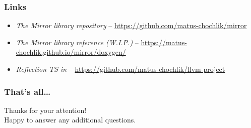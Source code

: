 \documentclass[compress,table,xcolor=table]{beamer}
\begin{document}
\begin{frame}
  \frametitle{Links}
  \smaller
  \begin{itemize}
    \item {\em The Mirror library repository} --
      \url{https://github.com/matus-chochlik/mirror}
    \item {\em The Mirror library reference (W.I.P.)} --
      \url{https://matus-chochlik.github.io/mirror/doxygen/}
    \item {\em Reflection TS in } --
      \url{https://github.com/matus-chochlik/llvm-project}
  \end{itemize}
\end{frame}
\begin{frame}
  \frametitle{That's all\dots}
  \centering
  \Huge
  Thanks for your attention!\\
  \Large
  Happy to answer any additional questions.
\end{frame}
\end{document}
